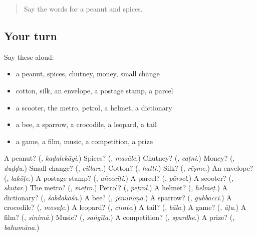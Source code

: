 \begin{quote}
Say the words for a peanut and spices.
\end{quote}

\subsection*{Your turn}
Say these aloud:

\begin{itemize}
\raggedright
  \item a peanut, spices, chutney, money, small change
  \item cotton, silk, an envelope, a postage stamp, a parcel
  \item a scooter, the metro, petrol, a helmet, a dictionary
  \item a bee, a sparrow, a crocodile, a leopard, a tail
  \item a game, a film, music, a competition, a prize
\end{itemize}

\begin{tcolorbox}[breakable,colback=teal!4,colframe=teal!35!black,title={Before you move on}]
A peanut? (\textbf{}, \emph{kaḍalekāyi}.) Spices? (\textbf{}, \emph{masāle}.) Chutney? (\textbf{}, \emph{caṭni}.) Money? (\textbf{}, \emph{duḍḍu}.) Small change? (\textbf{}, \emph{cillare}.) Cotton? (\textbf{}, \emph{hatti}.) Silk? (\textbf{}, \emph{rēṣme}.) An envelope? (\textbf{}, \emph{lakōṭe}.) A postage stamp? (\textbf{}, \emph{añcecīṭi}.) A parcel? (\textbf{}, \emph{pārsel}.) A scooter? (\textbf{}, \emph{skūṭar}.) The metro? (\textbf{}, \emph{meṭrō}.) Petrol? (\textbf{}, \emph{peṭrōl}.) A helmet? (\textbf{}, \emph{helmeṭ}.) A dictionary? (\textbf{}, \emph{śabdakōśa}.) A bee? (\textbf{}, \emph{jēnunoṇa}.) A sparrow? (\textbf{}, \emph{gubbacci}.) A crocodile? (\textbf{}, \emph{mosaḷe}.) A leopard? (\textbf{}, \emph{cirate}.) A tail? (\textbf{}, \emph{bāla}.) A game? (\textbf{}, \emph{āṭa}.) A film? (\textbf{}, \emph{sinimā}.) Music? (\textbf{}, \emph{saṅgīta}.) A competition? (\textbf{}, \emph{spardhe}.) A prize? (\textbf{}, \emph{bahumāna}.)
\end{tcolorbox}
